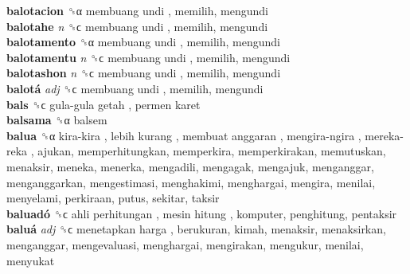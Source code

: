 \textbf{balotacion} ␝α   membuang undi , memilih, mengundi  \\
\textbf{balotahe} \emph{n}  ␝ϲ   membuang undi , memilih, mengundi  \\
\textbf{balotamento} ␝α   membuang undi , memilih, mengundi  \\
\textbf{balotamentu} \emph{n}  ␝ϲ   membuang undi , memilih, mengundi  \\
\textbf{balotashon} \emph{n}  ␝ϲ   membuang undi , memilih, mengundi  \\
\textbf{balotá} \emph{adj}  ␝ϲ   membuang undi , memilih, mengundi  \\
\textbf{bals} ␝ϲ   gula-gula getah ,  permen karet   \\
\textbf{balsama} ␝α  balsem  \\
\textbf{balua} ␝α   kira-kira ,  lebih kurang ,  membuat anggaran ,  mengira-ngira ,  mereka-reka , ajukan, memperhitungkan, memperkira, memperkirakan, memutuskan, menaksir, meneka, menerka, mengadili, mengagak, mengajuk, menganggar, menganggarkan, mengestimasi, menghakimi, menghargai, mengira, menilai, menyelami, perkiraan, putus, sekitar, taksir  \\
\textbf{baluadó} ␝ϲ   ahli perhitungan ,  mesin hitung , komputer, penghitung, pentaksir  \\
\textbf{baluá} \emph{adj}  ␝ϲ   menetapkan harga , berukuran, kimah, menaksir, menaksirkan, menganggar, mengevaluasi, menghargai, mengirakan, mengukur, menilai, menyukat  \\
